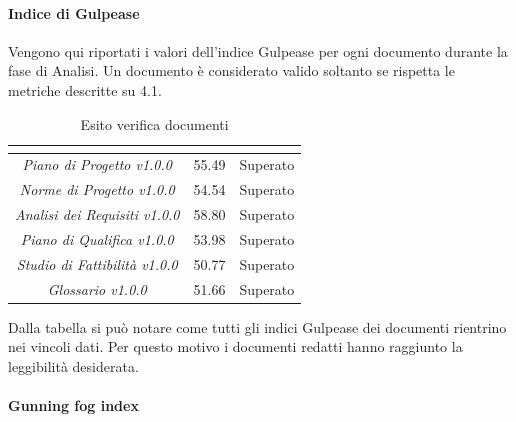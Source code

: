 \paragraph{Indice di Gulpease} \Spazio
Vengono qui riportati i valori dell'indice Gulpease per ogni documento durante la fase
di Analisi. Un documento è considerato valido soltanto se rispetta le metriche descritte
su 4.1.
\renewcommand{\arraystretch}{1.5}
\begin{table}[H]
\begin{center}
\begin{tabular}{|c|c|c|}
\hline
\rowcolor{title_row}
\textbf{\color{title_text}{Documento}} & \textbf{\color{title_text}{Valore indice}} & \textbf{\color{title_text}{Esito}} \\
\hline
	\emph{Piano di Progetto v1.0.0} & {55.49} & {Superato}\\
\hline
	\emph{Norme di Progetto v1.0.0} & {54.54} & {Superato}\\
\hline
	\emph{Analisi dei Requisiti v1.0.0} & {58.80} & {Superato}\\
\hline
	\emph{Piano di Qualifica v1.0.0} & {53.98} & {Superato}\\
\hline
	\emph{Studio di Fattibilità v1.0.0} & {50.77} & {Superato}\\
\hline
	\emph{Glossario v1.0.0} & {51.66} & {Superato}\\
\hline
\end{tabular}
\caption[Esiti verifica documenti, Analisi]{Esito verifica documenti}
\label{tabella:verifica documenti}
\end{center}
\end{table}
\renewcommand{\arraystretch}{1}

Dalla tabella si può notare come tutti gli indici Gulpease dei documenti rientrino nei vincoli dati. Per questo motivo i documenti redatti hanno raggiunto la leggibilità desiderata.

\paragraph{Gunning fog index} \Spazio

